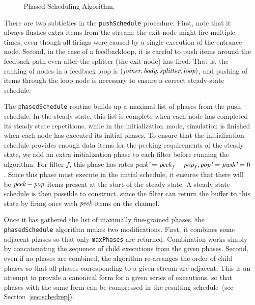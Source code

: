 \documentclass{sig-alt-full}
\begin{document}
\begin{figure}[t]
\vspace{3pt}
\vspace{-26pt}
\caption{\small Phased Scheduling Algorithm.\protect\label{fig:phasealg}}
\vspace{-8pt}
\end{figure}

There are two subtleties in the {\tt pushSchedule} procedure.  First,
note that it always flushes extra items from the stream: the exit node
might fire multiple times, even though all firings were caused by a
single execution of the entrance node.  Second, in the case of a
feedbackloop, it is careful to push items around the feedback path
even after the splitter (the exit node) has fired.  That is, the
ranking of nodes in a feedback loop is $(\mbox{\it joiner}, \mbox{\it body},
\mbox{\it splitter}, \mbox{\it loop})$, and pushing of items through the loop node
is necessary to ensure a correct steady-state schedule.

The {\tt phasedSchedule} routine builds up a maximal list of phases
from the push schedule.  In the steady state, this list is complete
when each node has completed its steady state repetitions, while in
the initialization mode, simulation is finished when each node has
executed its initial phases.  To ensure that the initialization
schedule provides enough data items for the peeking requirements of
the steady state, we add an extra initialization phase to each filter
before running the algorithm.  For filter $f$, this phase has rates
$\mbox{\it peek'}=\mbox{\it peek}_f - \mbox{\it pop}_f, \mbox{\it pop'}=\mbox{\it push'}=0$.  Since
this phase must execute in the initial schedule, it ensures that there
will be $\mbox{\it peek}-\mbox{\it pop}$ items present at the start of the steady
state.  A steady state schedule is then possible to construct, since
the filter can return the buffer to this state by firing once with
$\mbox{\it peek}$ items on the channel.

Once it has gathered the list of maximally fine-grained phases, the
{\tt phasedSchedule} algorithm makes two modifications.  First, it
combines some adjacent phases so that only {\tt maxPhases} are
returned.  Combination works simply by concatenating the sequence of
child executions from the given phases.  Second, even if no phases are
combined, the algorithm re-arranges the order of child phases so that
all phases corresponding to a given stream are adjacent.  This is an
attempt to provide a canonical form for a given series of executions,
so that phases with the same form can be compressed in the resulting
schedule~(see Section~\ref{sec:schedrep}).
\end{document}
